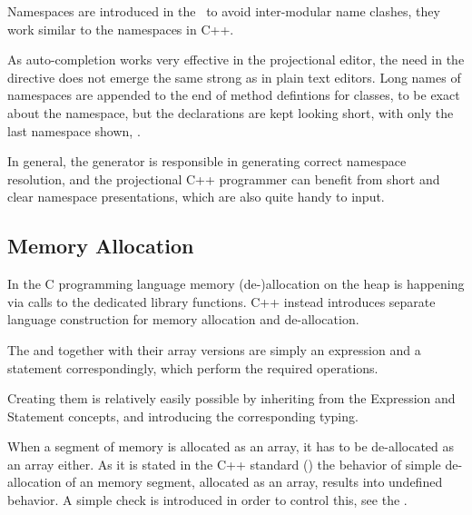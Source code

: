 Namespaces are introduced in the \pcpp\ to avoid inter-modular name clashes, they work similar to 
the namespaces in C++.

As auto-completion works very effective in the projectional editor, the need in the  directive does
not emerge the same strong as in plain text editors. Long names of namespaces are appended to the end of method
defintions for classes, to be exact about the namespace, but the declarations are kept looking short, with only 
the last namespace shown, .


In general, the generator is responsible in generating correct namespace 
resolution, and the projectional C++ programmer can benefit from short and clear namespace
presentations, which are also quite handy to input.



\subsection{Memory Allocation}

In the C programming language memory (de-)allocation on the heap is happening via calls to the dedicated library functions. 
C++ instead introduces separate language construction for memory allocation and de-allocation. 

The  and  together with their array versions are simply an expression and a statement correspondingly,
which perform the required operations.

Creating them is relatively easily possible by inheriting from the Expression and Statement concepts,
and introducing the corresponding typing.

When a segment of memory is allocated as an array, it has to be de-allocated as an array either.
As it is stated in the C++ standard (\cite{cpp11}) the behavior of simple de-allocation of an 
memory segment, allocated as an array, results into undefined behavior. A simple check is introduced
in order to control this, see the . 





%
%



